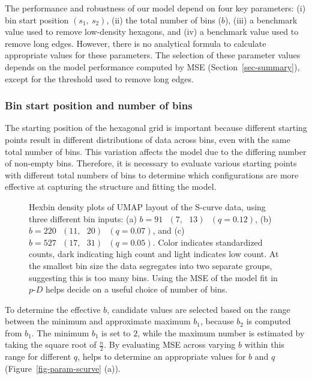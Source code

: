\documentclass[
  12pt]{article}
\begin{document}
The performance and robustness of our model depend on four key
parameters: (i) bin start position \((s_1, \ s_2)\), (ii) the total
number of bins (\(b\)), (iii) a benchmark value used to remove
low-density hexagons, and (iv) a benchmark value used to remove long
edges. However, there is no analytical formula to calculate appropriate
values for these parameters. The selection of these parameter values
depends on the model performance computed by MSE
(Section~\ref{sec-summary}), except for the threshold used to remove
long edges.

\subsubsection{Bin start position and number of
bins}\label{bin-start-position-and-number-of-bins}

The starting position of the hexagonal grid is important because
different starting points result in different distributions of data
across bins, even with the same total number of bins. This variation
affects the model due to the differing number of non-empty bins.
Therefore, it is necessary to evaluate various starting points with
different total numbers of bins to determine which configurations are
more effective at capturing the structure and fitting the model.

\begin{figure}[H]


\caption{\label{fig-bins-scurve}Hexbin density plots of UMAP layout of
the S-curve data, using three different bin inputs: (a)
\(b = 91 \text{ } (7, \text{ }13)  \text{ }(q = 0.12)\), (b)
\(b = 220 \text{ } (11, \text{ }20) \text{ }(q = 0.07)\), and (c)
\(b = 527 \text{ } (17, \text{ }31) \text{ }(q = 0.05)\). Color
indicates standardized counts, dark indicating high count and light
indicates low count. At the smallest bin size the data segregates into
two separate groups, suggesting this is too many bins. Using the MSE of
the model fit in \(p\text{-}D\) helps decide on a useful choice of
number of bins.}

\end{figure}%

To determine the effective \(b\), candidate values are selected based on
the range between the minimum and approximate maximum \(b_1\), because
\(b_2\) is computed from \(b_1\). The minimum \(b_1\) is set to \(2\),
while the maximum number is estimated by taking the square root of
\(\frac{n}{2}\). By evaluating MSE across varying \(b\) within this
range for different \(q\), helps to determine an appropriate values for
\(b\) and \(q\) (Figure~\ref{fig-param-scurve} (a)).
\end{document}
